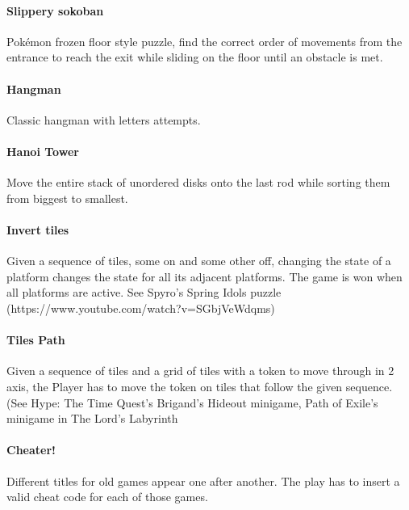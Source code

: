 \paragraph{Slippery sokoban} Pokémon frozen floor style puzzle, find the correct order of movements from the entrance to reach the exit while sliding on the floor until an obstacle is met.


\paragraph{Hangman} Classic hangman with letters attempts.

\paragraph{Hanoi Tower} Move the entire stack of unordered disks onto the last rod while sorting them from biggest to smallest.

\paragraph{Invert tiles} Given a sequence of tiles, some on and some other off, changing the state of a platform changes the state for all its adjacent platforms. The game is won when all platforms are active. See Spyro's Spring Idols puzzle (https://www.youtube.com/watch?v=SGbjVeWdqms)


\paragraph{Tiles Path} Given a sequence of tiles and a grid of tiles with a token to move through in 2 axis, the Player has to move the token on tiles that follow the given sequence. (See Hype: The Time Quest's Brigand's Hideout minigame, Path of Exile's minigame in The Lord's Labyrinth


\paragraph{Cheater!} Different titles for old games appear one after another. The play has to insert a valid cheat code for each of those games.


\pagebreak
